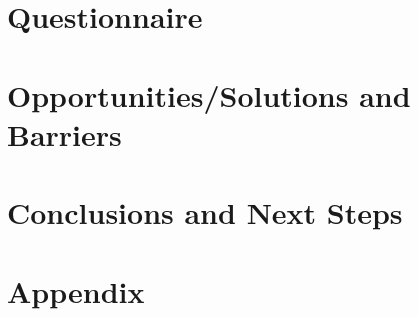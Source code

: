 \documentclass{../style/sig-alternate}
\begin{document}
\section{Questionnaire} 
\label{sec:questionnaire}


\section{Opportunities/Solutions and\\ Barriers} 

\label{sec:opportunities}


\section{Conclusions and Next Steps}

\label{sec:conclusion}


%
%

%

%

\section*{Appendix}
\label{Appendix}

\end{document}
